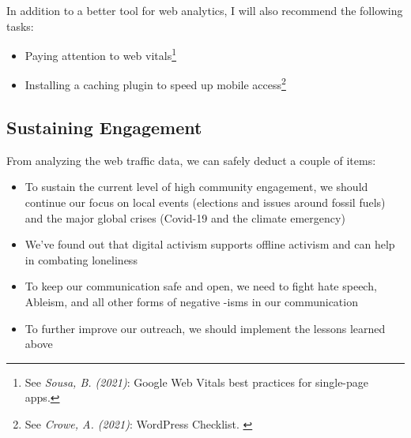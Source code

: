 In addition to a better tool for web analytics, I will also recommend the following tasks:

\begin{itemize}
 \item Paying attention to web vitals\footnote{See \textit{Sousa, B. (2021)}: Google Web Vitals best practices for single-page apps.\cite{webVitals}}
 \item Installing a caching plugin to speed up mobile access\footnote{See \textit{Crowe, A. (2021)}: WordPress Checklist. \cite{wpCachePlugin}}
\end{itemize}

\subsection{Sustaining Engagement}

From analyzing the web traffic data, we can safely deduct a couple of items:

\begin{itemize}
 \item To sustain the current level of high community engagement, we should continue our focus on local events (elections and issues around fossil fuels) and the major global crises (Covid-19 and the climate emergency)
 \item We've found out that digital activism supports offline activism and can help in combating loneliness
 \item To keep our communication safe and open, we need to fight hate speech, Ableism, and all other forms of negative -isms in our communication
 \item To further improve our outreach, we should implement the lessons learned above
\end{itemize}
